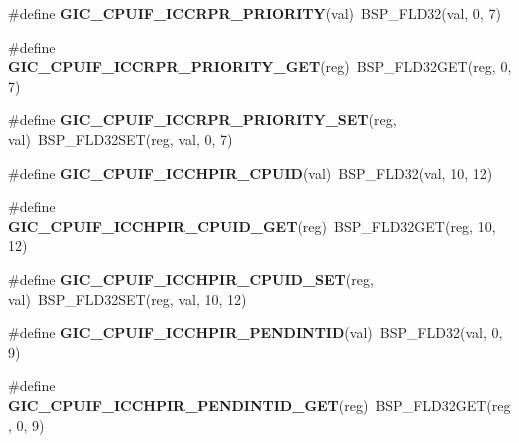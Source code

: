 \begin{DoxyCompactItemize}
\#define {\bfseries G\+I\+C\+\_\+\+C\+P\+U\+I\+F\+\_\+\+I\+C\+C\+R\+P\+R\+\_\+\+P\+R\+I\+O\+R\+I\+TY}(val)~B\+S\+P\+\_\+\+F\+L\+D32(val, 0, 7)
\item 
\mbox{\label{arm-gic-regs_8h_aa4d8ed5382a1166a1b531281767b697d}} 
\#define {\bfseries G\+I\+C\+\_\+\+C\+P\+U\+I\+F\+\_\+\+I\+C\+C\+R\+P\+R\+\_\+\+P\+R\+I\+O\+R\+I\+T\+Y\+\_\+\+G\+ET}(reg)~B\+S\+P\+\_\+\+F\+L\+D32\+G\+ET(reg, 0, 7)
\item 
\mbox{\label{arm-gic-regs_8h_a223bb25fec900a8c7749ed252f300aaf}} 
\#define {\bfseries G\+I\+C\+\_\+\+C\+P\+U\+I\+F\+\_\+\+I\+C\+C\+R\+P\+R\+\_\+\+P\+R\+I\+O\+R\+I\+T\+Y\+\_\+\+S\+ET}(reg,  val)~B\+S\+P\+\_\+\+F\+L\+D32\+S\+ET(reg, val, 0, 7)
\item 
\mbox{\label{arm-gic-regs_8h_ab81e7c045aa9f4c3551820c7f96889d0}} 
\#define {\bfseries G\+I\+C\+\_\+\+C\+P\+U\+I\+F\+\_\+\+I\+C\+C\+H\+P\+I\+R\+\_\+\+C\+P\+U\+ID}(val)~B\+S\+P\+\_\+\+F\+L\+D32(val, 10, 12)
\item 
\mbox{\label{arm-gic-regs_8h_a7cf5835e8ec503ddcdfba98dfac9684c}} 
\#define {\bfseries G\+I\+C\+\_\+\+C\+P\+U\+I\+F\+\_\+\+I\+C\+C\+H\+P\+I\+R\+\_\+\+C\+P\+U\+I\+D\+\_\+\+G\+ET}(reg)~B\+S\+P\+\_\+\+F\+L\+D32\+G\+ET(reg, 10, 12)
\item 
\mbox{\label{arm-gic-regs_8h_a601803e006d110f4e257abe529bc3a36}} 
\#define {\bfseries G\+I\+C\+\_\+\+C\+P\+U\+I\+F\+\_\+\+I\+C\+C\+H\+P\+I\+R\+\_\+\+C\+P\+U\+I\+D\+\_\+\+S\+ET}(reg,  val)~B\+S\+P\+\_\+\+F\+L\+D32\+S\+ET(reg, val, 10, 12)
\item 
\mbox{\label{arm-gic-regs_8h_ac34a1e80183683b9136f0def0ffda2df}} 
\#define {\bfseries G\+I\+C\+\_\+\+C\+P\+U\+I\+F\+\_\+\+I\+C\+C\+H\+P\+I\+R\+\_\+\+P\+E\+N\+D\+I\+N\+T\+ID}(val)~B\+S\+P\+\_\+\+F\+L\+D32(val, 0, 9)
\item 
\mbox{\label{arm-gic-regs_8h_af825ed59e761f4b3ee8bbb1861e00420}} 
\#define {\bfseries G\+I\+C\+\_\+\+C\+P\+U\+I\+F\+\_\+\+I\+C\+C\+H\+P\+I\+R\+\_\+\+P\+E\+N\+D\+I\+N\+T\+I\+D\+\_\+\+G\+ET}(reg)~B\+S\+P\+\_\+\+F\+L\+D32\+G\+ET(reg, 0, 9)
\item 
\mbox{\label{arm-gic-regs_8h_a145bbce399b3530c9b0769c48944c4cb}} 

\end{DoxyCompactItemize}
